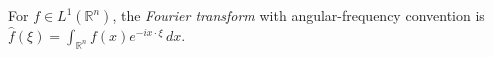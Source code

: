 
For $f\in L^1(\mathbb R^n)$, the \emph{Fourier transform} with angular-frequency convention is $\widehat f(\xi)=\int_{\mathbb R^n}f(x)e^{-ix\cdot\xi}\,dx$.
